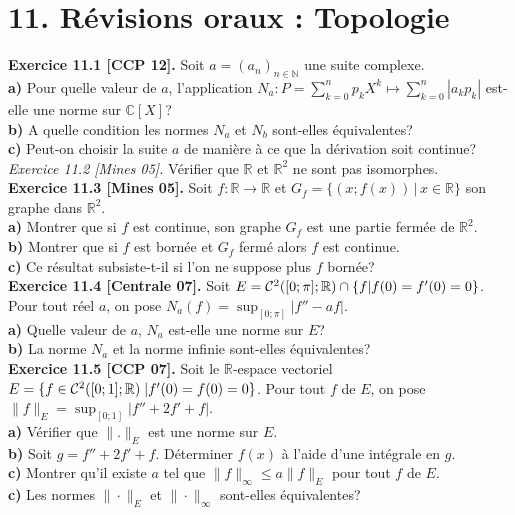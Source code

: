 \documentclass[a4paper,12pt,francais]{article}
\newcommand{\field}[1]{\mathbb{#1}}
\newcommand{\N}{\field{N}}
\newcommand{\R}{\field{R}}
\newcommand{\C}{\field{C}}
\begin{document}



\newpage
\section*{11. Révisions oraux : Topologie} 

\noindent
{\bf Exercice 11.1 [CCP 12].} Soit $a=(a_n)_{n\in \N}$ une suite
complexe.\\
{\bf a)} Pour quelle valeur de $a$, l'application $\displaystyle N_a:P=\sum_{k=0}^n
p_k X^k \mapsto \sum_{k=0}^n |a_kp_k|$ est-elle une norme sur
$\C[X]$?\\
{\bf b)} A quelle condition les normes $N_a$ et $N_b$ sont-elles
équivalentes?\\
{\bf c)} Peut-on choisir la suite $a$ de manière à ce que la
dérivation soit continue?\\

\noindent
{\it Exercice 11.2 [Mines 05].} Vérifier que $\R$ et $\R^2$ ne sont pas
isomorphes.\\

\noindent
{\bf Exercice 11.3 [Mines 05].} Soit $f: \R \to \R$ et $G_f=\{(x;f(x))\, |\, x\in \R\}$ son graphe dans $\R^2$.\\
\indent
{\bf a)} Montrer que si $f$ est continue, son graphe $G_f$ est une
partie fermée de $\R^2$.\\
\indent
{\bf b)} Montrer que si $f$ est bornée et $G_f$ fermé alors $f$ est
continue.\\
\indent
{\bf c)} Ce résultat subsiste-t-il si l'on ne suppose plus $f$ bornée?\\

\noindent
{\bf Exercice 11.4 [Centrale 07].} Soit $E={\cal{C}}^2([0;\pi];\R) \cap \{f|f(0)=f'(0)=0\}$. Pour tout réel $a$, on pose $N_a(f)=\sup_{[0;\pi]} |f''-af|$.\\
\indent
{\bf a)} Quelle valeur de $a$, $N_a$ est-elle une norme sur $E$?\\
\indent
{\bf b)} La norme $N_a$ et la norme infinie sont-elles équivalentes?\\

\noindent
{\bf Exercice 11.5 [CCP 07].} Soit le $\R$-espace vectoriel $E=\{f\in {\cal{C}}^2([0;1];\R)\; | f'(0)=f(0)=0\}$. Pour tout $f$ de $E$, on pose $\|f\|_E=\sup_{[0;1]} |f''+2f'+f|$.\\
\indent
{\bf a)} Vérifier que $\|.\|_E$ est une norme sur $E$.\\
\indent
{\bf b)} Soit $g=f''+2f'+f$. Déterminer $f(x)$ à l'aide d'une intégrale en $g$.\\
\indent
{\bf c)} Montrer qu'il existe $a$ tel que $\|f\|_\infty \leqslant a \|f\|_E$ pour tout $f$ de $E$.\\
\indent
{\bf c)} Les normes $\|\cdot\|_E$ et $\|\cdot\|_\infty$ sont-elles équivalentes? \\
\end{document}

